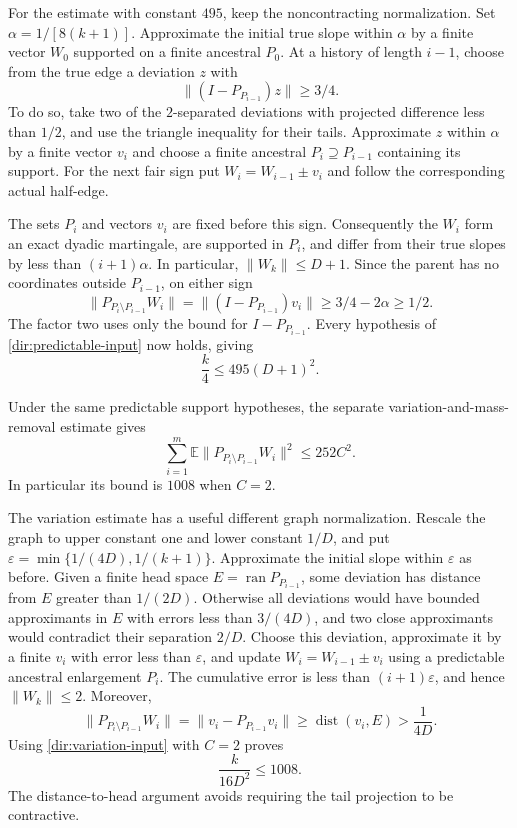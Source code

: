 For the estimate with constant $495$, keep the noncontracting
normalization.  Set $\alpha=1/[8(k+1)]$.  Approximate the initial true
slope within $\alpha$ by a finite vector $W_0$ supported on a finite
ancestral $P_0$.  At a history of length $i-1$, choose from the true
edge a deviation $z$ with
\[
 \|(I-P_{P_{i-1}})z\|\ge3/4.
\]
To do so, take two of the $2$-separated deviations with projected
difference less than $1/2$, and use the triangle inequality for their
tails.  Approximate $z$ within $\alpha$ by a finite vector $v_i$ and
choose a finite ancestral $P_i\supseteq P_{i-1}$ containing its support.
For the next fair sign put $W_i=W_{i-1}\pm v_i$ and follow the
corresponding actual half-edge.

The sets $P_i$ and vectors $v_i$ are fixed before this sign.  Consequently
the $W_i$ form an exact dyadic martingale, are supported in $P_i$, and
differ from their true slopes by less than $(i+1)\alpha$.  In particular,
$\|W_k\|\le D+1$.  Since the parent has no coordinates outside
$P_{i-1}$, on either sign
\[
 \|P_{P_i\setminus P_{i-1}}W_i\|
 =\|(I-P_{P_{i-1}})v_i\|
 \ge3/4-2\alpha\ge1/2.
\]
The factor two uses only the bound for $I-P_{P_{i-1}}$.
Every hypothesis of \eqref{dir:predictable-input} now holds, giving
\begin{equation}\label{dir:495-conclusion}
 \frac{k}{4}\le495(D+1)^2.
\end{equation}

Under the same predictable support hypotheses, the separate
variation-and-mass-removal estimate
\cite[Theorem~6.3]{TreePotentials} gives
\begin{equation}\label{dir:variation-input}
 \sum_{i=1}^m\mathbb E\|P_{P_i\setminus P_{i-1}}W_i\|^2\le252C^2.
\end{equation}
In particular its bound is $1008$ when $C=2$.

The variation estimate has a useful different graph normalization.
Rescale the graph to upper constant one and lower constant $1/D$, and
put $\varepsilon=\min\{1/(4D),1/(k+1)\}$.  Approximate the initial
slope within $\varepsilon$ as before.  Given a finite head space
$E=\operatorname{ran}P_{P_{i-1}}$, some deviation has distance from $E$
greater than $1/(2D)$.  Otherwise all deviations would have bounded
approximants in $E$ with errors less than $3/(4D)$, and two close
approximants would contradict their separation $2/D$.
Choose this deviation, approximate it by a finite $v_i$ with error less
than $\varepsilon$, and update $W_i=W_{i-1}\pm v_i$ using a predictable
ancestral enlargement $P_i$.  The cumulative error is less than
$(i+1)\varepsilon$, and hence $\|W_k\|\le2$.  Moreover,
\[
 \|P_{P_i\setminus P_{i-1}}W_i\|
 =\|v_i-P_{P_{i-1}}v_i\|
 \ge\operatorname{dist}(v_i,E)>\frac1{4D}.
\]
Using \eqref{dir:variation-input} with $C=2$ proves
\begin{equation}\label{dir:1008-conclusion}
 \frac{k}{16D^2}\le1008.
\end{equation}
The distance-to-head argument avoids requiring the tail projection to
be contractive.

